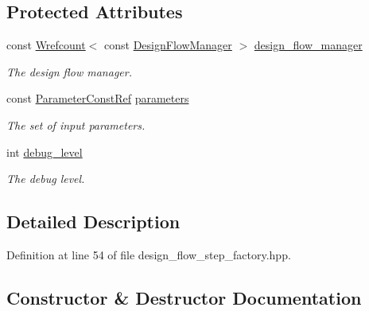 \subsection*{Protected Attributes}
\begin{DoxyCompactItemize}
\item 
const \hyperlink{classWrefcount}{Wrefcount}$<$ const \hyperlink{classDesignFlowManager}{Design\+Flow\+Manager} $>$ \hyperlink{classDesignFlowStepFactory_ae7854875d87ed8d2fb4d82b2fa017b79}{design\+\_\+flow\+\_\+manager}
\begin{DoxyCompactList}\small\item\em The design flow manager. \end{DoxyCompactList}\item 
const \hyperlink{Parameter_8hpp_a37841774a6fcb479b597fdf8955eb4ea}{Parameter\+Const\+Ref} \hyperlink{classDesignFlowStepFactory_ab2c8bba23db9f4066e1a27ee7157c2de}{parameters}
\begin{DoxyCompactList}\small\item\em The set of input parameters. \end{DoxyCompactList}\item 
int \hyperlink{classDesignFlowStepFactory_af40a2b630d65b0ec8e47248c16616253}{debug\+\_\+level}
\begin{DoxyCompactList}\small\item\em The debug level. \end{DoxyCompactList}\end{DoxyCompactItemize}


\subsection{Detailed Description}


Definition at line 54 of file design\+\_\+flow\+\_\+step\+\_\+factory.\+hpp.



\subsection{Constructor \& Destructor Documentation}
\mbox{\label{classDesignFlowStepFactory_aeedfbeb38320101d970256e261e98c6f}} 
